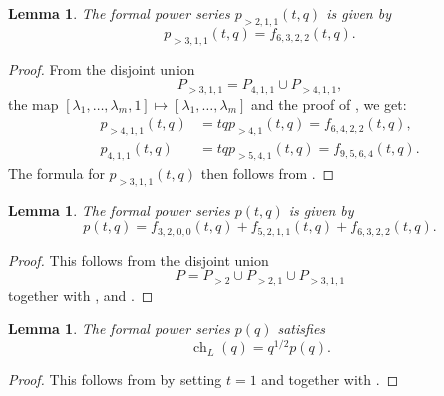\documentclass[a4paper, 12pt, reqno]{amsart}
\newtheorem{lemma}[theorem]{Lemma}
\theoremstyle{remark}
\DeclareMathOperator{\ch}{ch}
\begin{document}
\begin{lemma}
  \label{lmm:4}
  The formal power series $p_{>2, 1, 1}(t, q)$ is given by
  \begin{equation*}
    p_{>3, 1, 1}(t, q) = f_{6, 3, 2, 2}(t, q).
  \end{equation*}
\end{lemma}

\begin{proof}
  From the disjoint union
  \begin{equation*}
    P_{>3, 1, 1} = P_{4, 1, 1} \cup P_{>4, 1, 1},
  \end{equation*}
  the map $[\lambda_1, \dots, \lambda_m, 1] \mapsto [\lambda_1, \dots, \lambda_m]$ and the proof of , we get:
  \begin{align*}
    p_{>4, 1, 1}(t, q) &= tqp_{>4, 1}(t, q) = f_{6, 4, 2, 2}(t, q), \\
    p_{4, 1, 1}(t, q) &= tqp_{>5, 4, 1}(t, q) = f_{9, 5, 6, 4}(t, q).
  \end{align*}
  The formula for $p_{>3, 1, 1}(t, q)$ then follows from .
\end{proof}

\begin{lemma}
  \label{lmm:5}
  The formal power series $p(t, q)$ is given by
  \begin{equation*}
    p(t, q) = f_{3, 2, 0, 0}(t, q) + f_{5, 2, 1, 1}(t, q) + f_{6, 3, 2, 2}(t, q).
  \end{equation*}
\end{lemma}

\begin{proof}
  This follows from the disjoint union
  \begin{equation*}
    P = P_{>2} \cup P_{>2, 1} \cup P_{>3, 1, 1}
  \end{equation*}
  together with ,  and .
\end{proof}

\begin{lemma}
  \label{lmm:6}
  The formal power series $p(q)$ satisfies
  \begin{equation*}
    \ch_{L}(q) = q^{1/2}p(q).
  \end{equation*}
\end{lemma}

\begin{proof}
  This follows from  by setting $t = 1$ and \cite[Theorem 4]{andrews_singular_2022} together with .
\end{proof}
\end{document}
